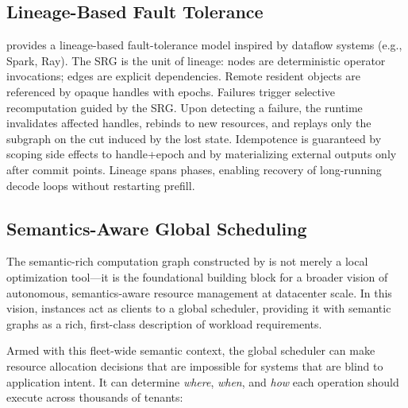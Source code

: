 \subsection{Lineage-Based Fault Tolerance}
\sys provides a lineage-based fault-tolerance model inspired by dataflow systems (e.g., Spark, Ray).
The SRG is the unit of lineage: nodes are deterministic operator invocations; edges are explicit dependencies.
Remote resident objects are referenced by opaque handles with epochs.
Failures trigger selective recomputation guided by the SRG.
Upon detecting a failure, the runtime invalidates affected handles, rebinds to new resources, and replays only the subgraph on the cut induced by the lost state.
Idempotence is guaranteed by scoping side effects to handle+epoch and by materializing external outputs only after commit points.
Lineage spans phases, enabling recovery of long-running decode loops without restarting prefill. 

\subsection{Semantics-Aware Global Scheduling}
\label{ssec:global_scheduling}

The semantic-rich computation graph constructed by \sys is not merely a local optimization tool---it is the foundational building block for a broader vision of autonomous, semantics-aware resource management at datacenter scale. In this vision, \sys instances act as clients to a global scheduler, providing it with semantic graphs as a rich, first-class description of workload requirements.

Armed with this fleet-wide semantic context, the global scheduler can make resource allocation decisions that are impossible for systems that are blind to application intent. It can determine \textit{where}, \textit{when}, and \textit{how} each operation should execute across thousands of tenants:

